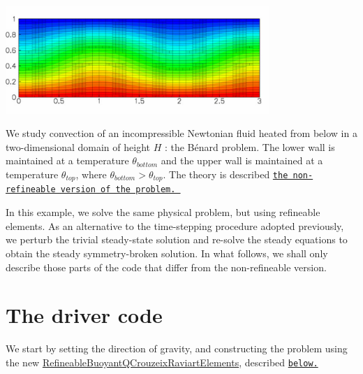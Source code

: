 
\begin{DoxyImage}
\includegraphics[width=0.75\textwidth]{cells}
\end{DoxyImage}


We study convection of an incompressible Newtonian fluid heated from below in a two-\/dimensional domain of height $ H $ \+: the B\'{e}nard problem. The lower wall is maintained at a temperature $ \theta_{bottom} $ and the upper wall is maintained at a temperature $ \theta_{top} $, where $ \theta_{bottom} > \theta_{top} $. The theory is described \href{../../b_convection/html/index.html}{\tt the non-\/refineable version of the problem. }

In this example, we solve the same physical problem, but using refineable elements. As an alternative to the time-\/stepping procedure adopted previously, we perturb the trivial steady-\/state solution and re-\/solve the steady equations to obtain the steady symmetry-\/broken solution. In what follows, we shall only describe those parts of the code that differ from the non-\/refineable version.



 

\hypertarget{index_main}{}\section{The driver code}\label{index_main}
We start by setting the direction of gravity, and constructing the problem using the new \hyperlink{index_element}{Refineable\+Buoyant\+Q\+Crouzeix\+Raviart\+Elements}, described \href{#element}{\tt below.}

